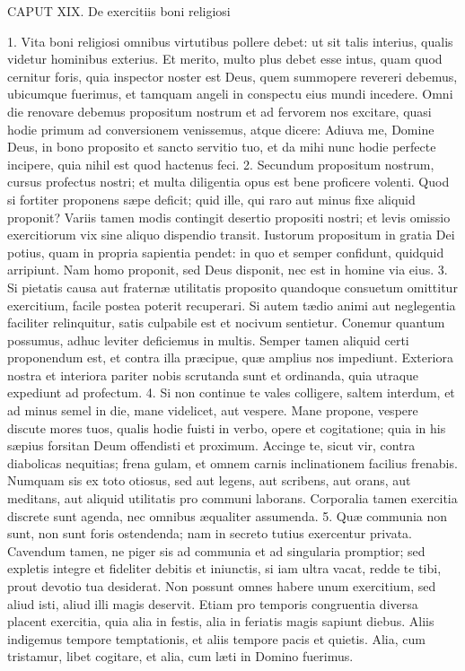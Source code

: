 CAPUT XIX.
De exercitiis boni religiosi

1. Vita boni religiosi omnibus virtutibus pollere debet: ut sit talis interius, qualis videtur hominibus exterius. Et merito, multo plus debet esse intus, quam quod cernitur foris, quia inspector noster est Deus, quem summopere revereri debemus, ubicumque fuerimus, et tamquam angeli in conspectu eius mundi incedere. Omni die renovare debemus propositum nostrum et ad fervorem nos excitare, quasi hodie primum ad conversionem venissemus, atque dicere: Adiuva me, Domine Deus, in bono proposito et sancto servitio tuo, et da mihi nunc hodie perfecte incipere, quia nihil est quod hactenus feci.
2. Secundum propositum nostrum, cursus profectus nostri; et multa diligentia opus est bene proficere volenti. Quod si fortiter proponens sæpe deficit; quid ille, qui raro aut minus fixe aliquid proponit? Variis tamen modis contingit desertio propositi nostri; et levis omissio exercitiorum vix sine aliquo dispendio transit. Iustorum propositum in gratia Dei potius, quam in propria sapientia pendet: in quo et semper confidunt, quidquid arripiunt. Nam homo proponit, sed Deus disponit, nec est in homine via eius.
3. Si pietatis causa aut fraternæ utilitatis proposito quandoque consuetum omittitur exercitium, facile postea poterit recuperari. Si autem tædio animi aut neglegentia faciliter relinquitur, satis culpabile est et nocivum sentietur. Conemur quantum possumus, adhuc leviter deficiemus in multis. Semper tamen aliquid certi proponendum est, et contra illa præcipue, quæ amplius nos impediunt. Exteriora nostra et interiora pariter nobis scrutanda sunt et ordinanda, quia utraque expediunt ad profectum.
4. Si non continue te vales colligere, saltem interdum, et ad minus semel in die, mane videlicet, aut vespere. Mane propone, vespere discute mores tuos, qualis hodie fuisti in verbo, opere et cogitatione; quia in his sæpius forsitan Deum offendisti et proximum. Accinge te, sicut vir, contra diabolicas nequitias; frena gulam, et omnem carnis inclinationem facilius frenabis. Numquam sis ex toto otiosus, sed aut legens, aut scribens, aut orans, aut meditans, aut aliquid utilitatis pro communi laborans. Corporalia tamen exercitia discrete sunt agenda, nec omnibus æqualiter assumenda.
5. Quæ communia non sunt, non sunt foris ostendenda; nam in secreto tutius exercentur privata. Cavendum tamen, ne piger sis ad communia et ad singularia promptior; sed expletis integre et fideliter debitis et iniunctis, si iam ultra vacat, redde te tibi, prout devotio tua desiderat. Non possunt omnes habere unum exercitium, sed aliud isti, aliud illi magis deservit. Etiam pro temporis congruentia diversa placent exercitia, quia alia in festis, alia in feriatis magis sapiunt diebus. Aliis indigemus tempore temptationis, et aliis tempore pacis et quietis. Alia, cum tristamur, libet cogitare, et alia, cum læti in Domino fuerimus.
